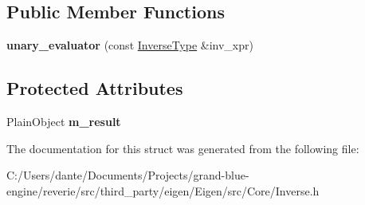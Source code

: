 \subsection*{Public Member Functions}
\begin{DoxyCompactItemize}
\item 
\mbox{\label{struct_eigen_1_1internal_1_1unary__evaluator_3_01_inverse_3_01_arg_type_01_4_01_4_a18eed69c3dd0654535d9a60683df6a47}} 
{\bfseries unary\+\_\+evaluator} (const \mbox{\hyperlink{class_eigen_1_1_inverse}{Inverse\+Type}} \&inv\+\_\+xpr)
\end{DoxyCompactItemize}
\subsection*{Protected Attributes}
\begin{DoxyCompactItemize}
\item 
\mbox{\label{struct_eigen_1_1internal_1_1unary__evaluator_3_01_inverse_3_01_arg_type_01_4_01_4_a81afbed9d66427ec1f21d8e5e5194fbc}} 
Plain\+Object {\bfseries m\+\_\+result}
\end{DoxyCompactItemize}


The documentation for this struct was generated from the following file\+:\begin{DoxyCompactItemize}
\item 
C\+:/\+Users/dante/\+Documents/\+Projects/grand-\/blue-\/engine/reverie/src/third\+\_\+party/eigen/\+Eigen/src/\+Core/Inverse.\+h\end{DoxyCompactItemize}
